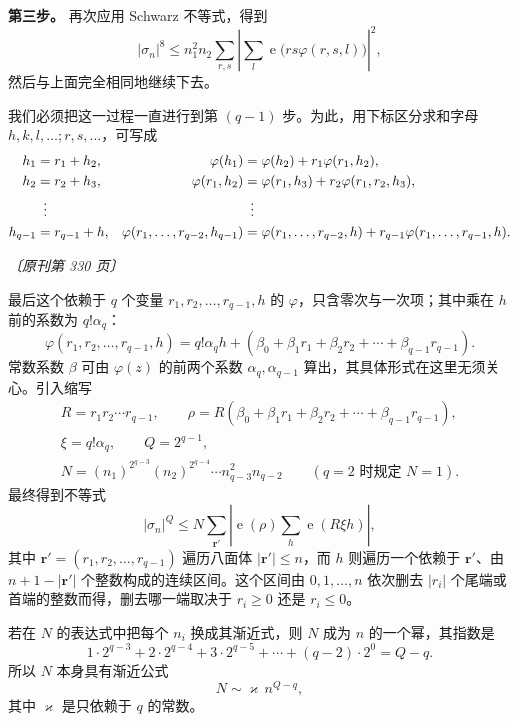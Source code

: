 \documentclass[UTF8,11pt,a4paper,fontset=none]{ctexart}
\theoremstyle{weylthm}
\newcommand{\e}{\operatorname{e}}
\newcommand{\origpage}[1]{%
  \par\vspace{0.7em}\noindent\hfill{\small\itshape〔原刊第 #1 页〕}\par\vspace{0.25em}}
\begin{document}
\medskip
\noindent\textbf{第三步。}
再次应用 Schwarz 不等式，得到
\[
 |\sigma_n|^8
 \leq n_1^2n_2\sum_{r,s}
 \left|\sum_l\e\bigl(rs\varphi(r,s,l)\bigr)\right|^2,
\]
然后与上面完全相同地继续下去。

我们必须把这一过程一直进行到第 \((q-1)\) 步。为此，用下标区分求和字母
\(h,k,l,\ldots;r,s,\ldots\)，可写成
\[
\begin{aligned}
 h_1&=r_1+h_2,
 &\varphi(h_1)&=\varphi(h_2)+r_1\varphi(r_1,h_2),\\
 h_2&=r_2+h_3,
 &\varphi(r_1,h_2)&=\varphi(r_1,h_3)+r_2\varphi(r_1,r_2,h_3),\\
 &\vdotswithin{=}
 & &\vdotswithin{=}\\
 h_{q-1}&=r_{q-1}+h,
 &\varphi(r_1,\ldots,r_{q-2},h_{q-1})
 &=\varphi(r_1,\ldots,r_{q-2},h)
   +r_{q-1}\varphi(r_1,\ldots,r_{q-1},h).
\end{aligned}
\]

\origpage{330}

最后这个依赖于 \(q\) 个变量
\(r_1,r_2,\ldots,r_{q-1},h\) 的 \(\varphi\)，只含零次与一次项；其中乘在
\(h\) 前的系数为 \(q!\alpha_q\)：
\[
 \varphi(r_1,r_2,\ldots,r_{q-1},h)
 =q!\alpha_q h
 +(\beta_0+\beta_1r_1+\beta_2r_2+\cdots+\beta_{q-1}r_{q-1}).
\]
常数系数 \(\beta\) 可由 \(\varphi(z)\) 的前两个系数
\(\alpha_q,\alpha_{q-1}\) 算出，其具体形式在这里无须关心。引入缩写
\[
\begin{gathered}
 R=r_1r_2\cdots r_{q-1},\qquad
 \rho=R(\beta_0+\beta_1r_1+\beta_2r_2+\cdots+\beta_{q-1}r_{q-1}),\\
 \xi=q!\alpha_q,
 \qquad
 Q=2^{q-1},\\
 N=(n_1)^{2^{q-3}}(n_2)^{2^{q-4}}\cdots n_{q-3}^{2}n_{q-2}
 \qquad(q=2\text{ 时规定 }N=1).
\end{gathered}
\]
最终得到不等式
\begin{equation}
 |\sigma_n|^Q
 \leq N\sum_{\mathbf r'}
 \left|\e(\rho)\sum_h\e(R\xi h)\right|,
 \tag{11}
\end{equation}
其中 \(\mathbf r'=(r_1,r_2,\ldots,r_{q-1})\) 遍历八面体
\(|\mathbf r'|\leq n\)，而 \(h\) 则遍历一个依赖于 \(\mathbf r'\)、由
\(n+1-|\mathbf r'|\) 个整数构成的连续区间。这个区间由
\(0,1,\ldots,n\) 依次删去 \(|r_i|\) 个尾端或首端的整数而得，删去哪一端取决于
\(r_i\geq0\) 还是 \(r_i\leq0\)。

若在 \(N\) 的表达式中把每个 \(n_i\) 换成其渐近式，则 \(N\) 成为
\(n\) 的一个幂，其指数是
\[
 1\cdot2^{q-3}+2\cdot2^{q-4}+3\cdot2^{q-5}+\cdots+(q-2)\cdot2^0
 =Q-q.
\]
所以 \(N\) 本身具有渐近公式
\[
 N\sim\varkappa\,n^{Q-q},
\]
其中 \(\varkappa\) 是只依赖于 \(q\) 的常数。
\end{document}
